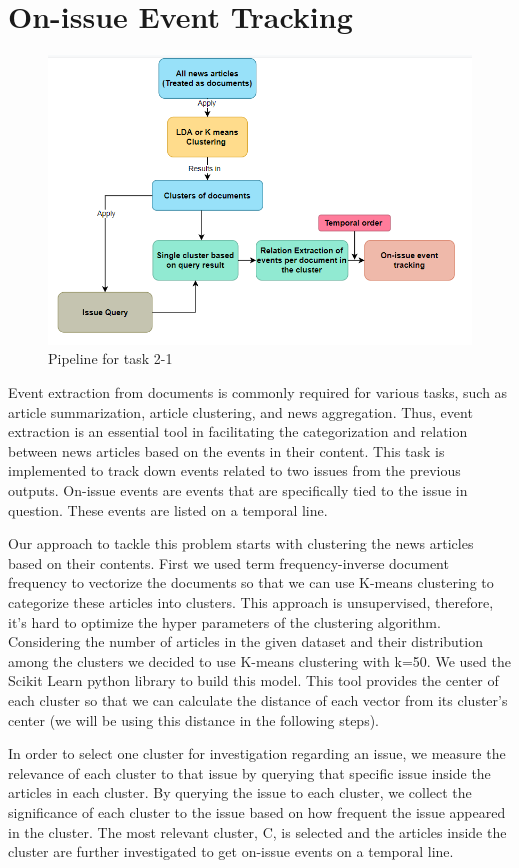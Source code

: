 \documentclass[sigconf,authorversion,nonacm]{acmart}
\begin{document}
\section{On-issue Event Tracking}
\begin{figure}[ht]
    \includegraphics[width=0.9\linewidth]{img/image13.png}
    \caption{Pipeline for task 2-1}
\end{figure}
Event extraction from documents is commonly required for various tasks, such as article summarization, article clustering, and news aggregation. Thus, event extraction is an essential tool in facilitating the categorization and relation between news articles based on the events in their content. This task is implemented to track down events related to two issues from the previous outputs. On-issue events are events that are specifically tied to the issue in question. These events are listed on a temporal line. 

Our approach to tackle this problem starts with clustering the news articles based on their contents. First we used term frequency-inverse document frequency to vectorize the documents so that we can use K-means clustering to categorize these articles into clusters. This approach is unsupervised, therefore, it’s hard to optimize the hyper parameters of the clustering algorithm. Considering the number of articles in the given dataset and their distribution among the clusters we decided to use K-means clustering with k=50. We used the Scikit Learn python library to build this model. This tool provides the center of each cluster so that we can calculate the distance of each vector from its cluster’s center (we will be using this distance in the following steps). 

In order to select one cluster for investigation regarding an issue, we measure the relevance of each cluster to that issue by querying that specific issue inside the articles in each cluster. By querying the issue to each cluster, we collect the significance of each cluster to the issue based on how frequent the issue appeared in the cluster. The most relevant cluster, C, is selected and the articles inside the cluster are further investigated to get on-issue events on a temporal line. 
\end{document}
